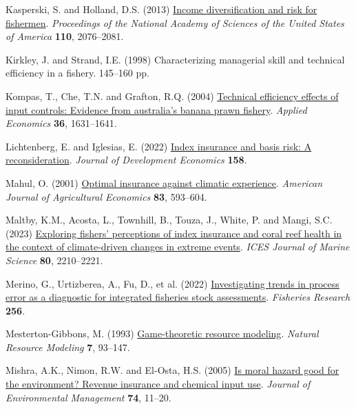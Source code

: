 \documentclass[
  letterpaper,
  DIV=11,
  numbers=noendperiod]{scrartcl}
\newlength{\cslhangindent}
\newenvironment{CSLReferences}[2] %
 {\begin{list}{}{%
  \setlength{\itemindent}{0pt}
  \setlength{\leftmargin}{0pt}
  \setlength{\parsep}{0pt}
  \ifodd #1
   \setlength{\leftmargin}{\cslhangindent}
   \setlength{\itemindent}{-1\cslhangindent}
  \fi
  \setlength{\itemsep}{#2\baselineskip}}}
 {\end{list}}
\theoremstyle{plain}
\theoremstyle{plain}
\theoremstyle{remark}
\begin{document}
\begin{CSLReferences}{1}{0}
Kasperski, S. and Holland, D.S. (2013)
\href{https://doi.org/10.1073/pnas.1212278110}{Income diversification
and risk for fishermen}. \emph{Proceedings of the National Academy of
Sciences of the United States of America} \textbf{110}, 2076--2081.

Kirkley, J. and Strand, I.E. (1998) Characterizing managerial skill and
technical efficiency in a fishery. 145--160 pp.

Kompas, T., Che, T.N. and Grafton, R.Q. (2004)
\href{https://doi.org/10.1080/0003684042000218561}{Technical efficiency
effects of input controls: Evidence from australia's banana prawn
fishery}. \emph{Applied Economics} \textbf{36}, 1631--1641.

Lichtenberg, E. and Iglesias, E. (2022)
\href{https://doi.org/10.1016/j.jdeveco.2022.102883}{Index insurance and
basis risk: A reconsideration}. \emph{Journal of Development Economics}
\textbf{158}.

Mahul, O. (2001) \href{https://doi.org/10.1111/0002-9092.00180}{Optimal
insurance against climatic experience}. \emph{American Journal of
Agricultural Economics} \textbf{83}, 593--604.

Maltby, K.M., Acosta, L., Townhill, B., Touza, J., White, P. and Mangi,
S.C. (2023) \href{https://doi.org/10.1093/icesjms/fsac003}{Exploring
fishers' perceptions of index insurance and coral reef health in the
context of climate-driven changes in extreme events}. \emph{ICES Journal
of Marine Science} \textbf{80}, 2210--2221.

Merino, G., Urtizberea, A., Fu, D., et al. (2022)
\href{https://doi.org/10.1016/j.fishres.2022.106478}{Investigating
trends in process error as a diagnostic for integrated fisheries stock
assessments}. \emph{Fisheries Research} \textbf{256}.

Mesterton-Gibbons, M. (1993)
\href{https://doi.org/10.1111/j.1939-7445.1993.tb00143.x}{Game-theoretic
resource modeling}. \emph{Natural Resource Modeling} \textbf{7},
93--147.

Mishra, A.K., Nimon, R.W. and El-Osta, H.S. (2005)
\href{https://doi.org/10.1016/j.jenvman.2004.08.003}{Is moral hazard
good for the environment? Revenue insurance and chemical input use}.
\emph{Journal of Environmental Management} \textbf{74}, 11--20.


\end{CSLReferences}
\end{document}
